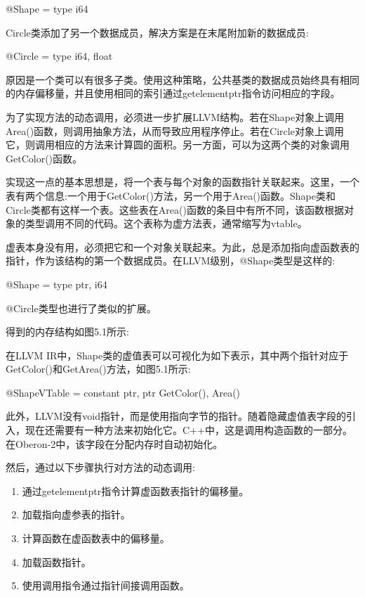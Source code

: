 \begin{shell}
@Shape = type { i64 }
\end{shell}

Circle类添加了另一个数据成员，解决方案是在末尾附加新的数据成员:

\begin{shell}
@Circle = type { i64, float }
\end{shell}


原因是一个类可以有很多子类。使用这种策略，公共基类的数据成员始终具有相同的内存偏移量，并且使用相同的索引通过getelementptr指令访问相应的字段。

为了实现方法的动态调用，必须进一步扩展LLVM结构。若在Shape对象上调用Area()函数，则调用抽象方法，从而导致应用程序停止。若在Circle对象上调用它，则调用相应的方法来计算圆的面积。另一方面，可以为这两个类的对象调用GetColor()函数。

实现这一点的基本思想是，将一个表与每个对象的函数指针关联起来。这里，一个表有两个信息:一个用于GetColor()方法，另一个用于Area()函数。Shape类和Circle类都有这样一个表。这些表在Area()函数的条目中有所不同，该函数根据对象的类型调用不同的代码。这个表称为虚方法表，通常缩写为vtable。

虚表本身没有用，必须把它和一个对象关联起来。为此，总是添加指向虚函数表的指针，作为该结构的第一个数据成员。在LLVM级别，@Shape类型是这样的:

\begin{shell}
@Shape = type { ptr, i64 }
\end{shell}

@Circle类型也进行了类似的扩展。

得到的内存结构如图5.1所示:


在LLVM IR中，Shape类的虚值表可以可视化为如下表示，其中两个指针对应于GetColor()和GetArea()方法，如图5.1所示:

\begin{shell}
@ShapeVTable = constant { ptr, ptr } { GetColor(), Area() }
\end{shell}

此外，LLVM没有void指针，而是使用指向字节的指针。随着隐藏虚值表字段的引入，现在还需要有一种方法来初始化它。C++中，这是调用构造函数的一部分。在Oberon-2中，该字段在分配内存时自动初始化。

然后，通过以下步骤执行对方法的动态调用:

\begin{enumerate}
\item
通过getelementptr指令计算虚函数表指针的偏移量。

\item
加载指向虚参表的指针。

\item
计算函数在虚函数表中的偏移量。

\item
加载函数指针。

\item
使用调用指令通过指针间接调用函数。
\end{enumerate}

